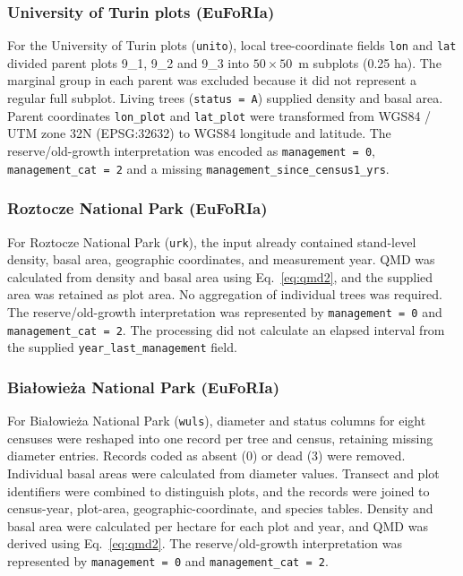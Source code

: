 \documentclass{myreport}
\begin{document}
% 

\subsubsection{University of Turin plots (EuFoRIa)}
For the University of Turin plots (\texttt{unito}), local tree-coordinate fields \texttt{lon} and \texttt{lat} divided parent plots 9\_1, 9\_2 and 9\_3 into $50\times50$~m subplots (0.25 ha). The marginal group in each parent was excluded because it did not represent a regular full subplot. Living trees (\texttt{status = A}) supplied density and basal area. Parent coordinates \texttt{lon\_plot} and \texttt{lat\_plot} were transformed from WGS84 / UTM zone 32N (EPSG:32632) to WGS84 longitude and latitude. The reserve/old-growth interpretation was encoded as \texttt{management = 0}, \texttt{management\_cat = 2} and a missing \texttt{management\_since\_census1\_yrs}.

% 

\subsubsection{Roztocze National Park (EuFoRIa)}
For Roztocze National Park (\texttt{urk}), the input already contained stand-level density, basal area, geographic coordinates, and measurement year. QMD was calculated from density and basal area using Eq.~\ref{eq:qmd2}, and the supplied area was retained as plot area. No aggregation of individual trees was required. The reserve/old-growth interpretation was represented by \texttt{management = 0} and \texttt{management\_cat = 2}. The processing did not calculate an elapsed interval from the supplied \texttt{year\_last\_management} field.

% 

\subsubsection{Bia\l{}owie\.{z}a National Park (EuFoRIa)}
For Bia\l{}owie\.{z}a National Park (\texttt{wuls}), diameter and status columns for eight censuses were reshaped into one record per tree and census, retaining missing diameter entries. Records coded as absent (0) or dead (3) were removed. Individual basal areas were calculated from diameter values. Transect and plot identifiers were combined to distinguish plots, and the records were joined to census-year, plot-area, geographic-coordinate, and species tables. Density and basal area were calculated per hectare for each plot and year, and QMD was derived using Eq.~\ref{eq:qmd2}. The reserve/old-growth interpretation was represented by \texttt{management = 0} and \texttt{management\_cat = 2}.
\end{document}
